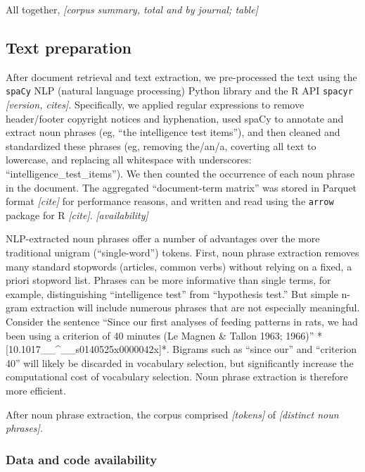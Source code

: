 \documentclass[12pt]{article}
\begin{document}
All together, \emph{{[}corpus summary, total and by journal; table{]}}

\hypertarget{text-preparation}{%
\subsection*{Text preparation}\label{text-preparation}}

After document retrieval and text extraction, we pre-processed the text
using the \texttt{spaCy} NLP (natural language processing) Python
library and the R API \texttt{spacyr} \emph{{[}version, cites{]}}.
Specifically, we applied regular expressions to remove header/footer
copyright notices and hyphenation, used spaCy to annotate and extract
noun phrases (eg, ``the intelligence test items''), and then cleaned and
standardized these phrases (eg, removing the/an/a, coverting all text to
lowercase, and replacing all whitespace with underscores:
``intelligence\_test\_items''). We then counted the occurrence of each
noun phrase in the document. The aggregated ``document-term matrix'' was
stored in Parquet format \emph{{[}cite{]}} for performance reasons, and
written and read using the \texttt{arrow} package for R
\emph{{[}cite{]}}. \emph{{[}availability{]}}

NLP-extracted noun phrases offer a number of advantages over the more
traditional unigram (``single-word'') tokens. First, noun phrase
extraction removes many standard stopwords (articles, common verbs)
without relying on a fixed, a priori stopword list. Phrases can be more
informative than single terms, for example, distinguishing
``intelligence test'' from ``hypothesis test.'' But simple n-gram
extraction will include numerous phrases that are not especially
meaningful. Consider the sentence ``Since our first analyses of feeding
patterns in rats, we had been using a criterion of 40 minutes (Le Magnen
\& Tallon 1963; 1966)'' *{[}10.1017\_\_\^{}\_\_s0140525x0000042x{]}*.
Bigrams such as ``since our'' and ``criterion 40'' will likely be
discarded in vocabulary selection, but significantly increase the
computational cost of vocabulary selection. Noun phrase extraction is
therefore more efficient.

After noun phrase extraction, the corpus comprised \emph{{[}tokens{]}}
of \emph{{[}distinct noun phrases{]}}.

\hypertarget{data-and-code-availability}{%
\subsubsection*{Data and code
availability}\label{data-and-code-availability}}
\end{document}
